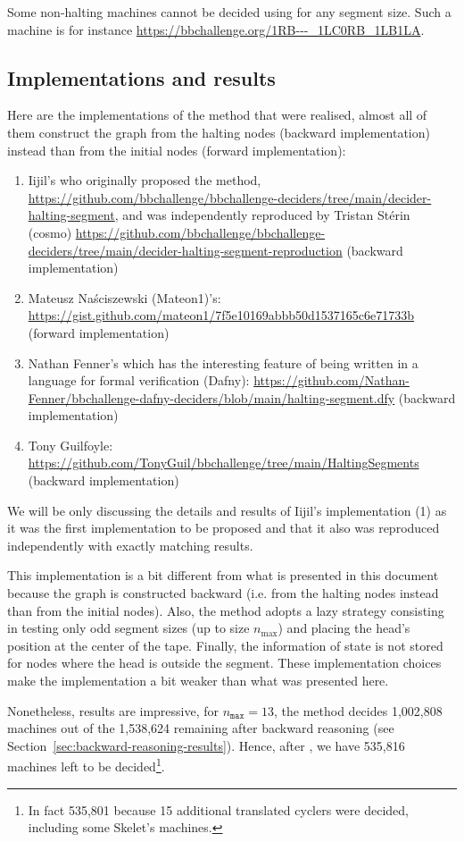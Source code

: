 \begin{remark}
  \normalfont Some non-halting machines cannot be decided using \HS for any segment size. Such a machine is for instance \url{https://bbchallenge.org/1RB---_1LC0RB_1LB1LA}.
\end{remark}

\subsection{Implementations and results}\label{sec:hs-implem}


Here are the implementations of the method that were realised, almost all of them construct the \HS graph from the halting nodes (backward implementation) instead than from the initial nodes (forward implementation):

\begin{enumerate}
  \item Iijil's who originally proposed the method, \url{https://github.com/bbchallenge/bbchallenge-deciders/tree/main/decider-halting-segment}, and was independently reproduced by Tristan Stérin (cosmo) \url{https://github.com/bbchallenge/bbchallenge-deciders/tree/main/decider-halting-segment-reproduction} (backward implementation)
  \item Mateusz Naściszewski (Mateon1)'s: \url{https://gist.github.com/mateon1/7f5e10169abbb50d1537165c6e71733b} (forward implementation)
  \item Nathan Fenner's which has the interesting feature of being written in a language for formal verification (Dafny): \url{https://github.com/Nathan-Fenner/bbchallenge-dafny-deciders/blob/main/halting-segment.dfy} (backward implementation)
  \item Tony Guilfoyle: \url{https://github.com/TonyGuil/bbchallenge/tree/main/HaltingSegments} (backward implementation)
\end{enumerate}

We will be only discussing the details and results of Iijil's implementation (1) as it was the first implementation to be proposed and that it also was reproduced independently with exactly matching results.

This implementation is a bit different from what is presented in this document because the \HS graph is constructed backward (i.e. from the halting nodes instead than from the initial nodes). Also, the method adopts a lazy strategy consisting in testing only odd segment sizes (up to size $n_\text{max}$) and placing the head's position at the center of the tape. Finally, the information of state is not stored for nodes where the head is outside the segment. These implementation choices make the implementation a bit weaker than what was presented here.

Nonetheless, results are impressive, for $n_\texttt{max} = 13$, the method decides 1,002,808 machines out of the 1,538,624 remaining after backward reasoning (see Section~\ref{sec:backward-reasoning-results}). Hence, after \HS, we have 535,816 machines left to be decided\footnote{In fact 535,801 because 15 additional translated cyclers were decided, including some Skelet's machines.}.